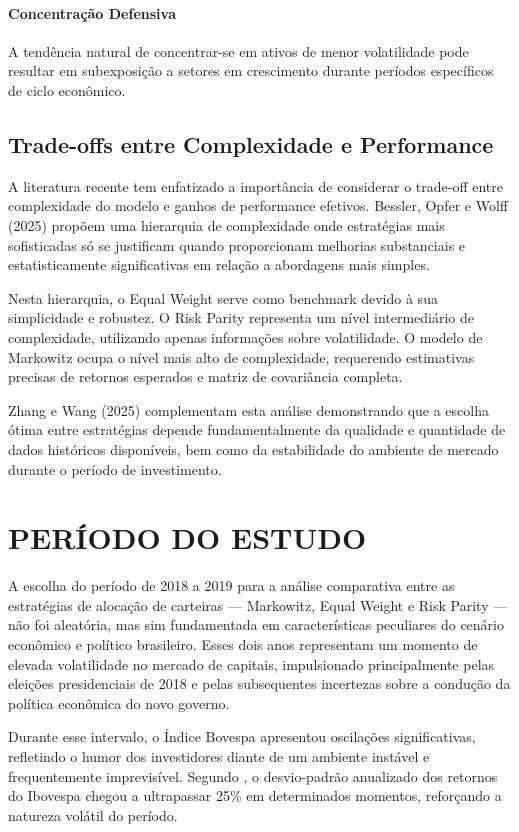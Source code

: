 \paragraph{Concentração Defensiva}
A tendência natural de concentrar-se em ativos de menor volatilidade pode resultar em subexposição a setores em crescimento durante períodos específicos de ciclo econômico.

\subsection{Trade-offs entre Complexidade e Performance}

A literatura recente tem enfatizado a importância de considerar o trade-off entre complexidade do modelo e ganhos de performance efetivos. Bessler, Opfer e Wolff (2025) propõem uma hierarquia de complexidade onde estratégias mais sofisticadas só se justificam quando proporcionam melhorias substanciais e estatisticamente significativas em relação a abordagens mais simples.

Nesta hierarquia, o Equal Weight serve como benchmark devido à sua simplicidade e robustez. O Risk Parity representa um nível intermediário de complexidade, utilizando apenas informações sobre volatilidade. O modelo de Markowitz ocupa o nível mais alto de complexidade, requerendo estimativas precisas de retornos esperados e matriz de covariância completa.

Zhang e Wang (2025) complementam esta análise demonstrando que a escolha ótima entre estratégias depende fundamentalmente da qualidade e quantidade de dados históricos disponíveis, bem como da estabilidade do ambiente de mercado durante o período de investimento.

\section{PERÍODO DO ESTUDO}

A escolha do período de 2018 a 2019 para a análise comparativa entre as estratégias de alocação de carteiras --- Markowitz, Equal Weight e Risk Parity --- não foi aleatória, mas sim fundamentada em características peculiares do cenário econômico e político brasileiro. Esses dois anos representam um momento de elevada volatilidade no mercado de capitais, impulsionado principalmente pelas eleições presidenciais de 2018 e pelas subsequentes incertezas sobre a condução da política econômica do novo governo.

Durante esse intervalo, o Índice Bovespa apresentou oscilações significativas, refletindo o humor dos investidores diante de um ambiente instável e frequentemente imprevisível. Segundo \cite{gregorio2020volatilidade}, o desvio-padrão anualizado dos retornos do Ibovespa chegou a ultrapassar 25\% em determinados momentos, reforçando a natureza volátil do período.

